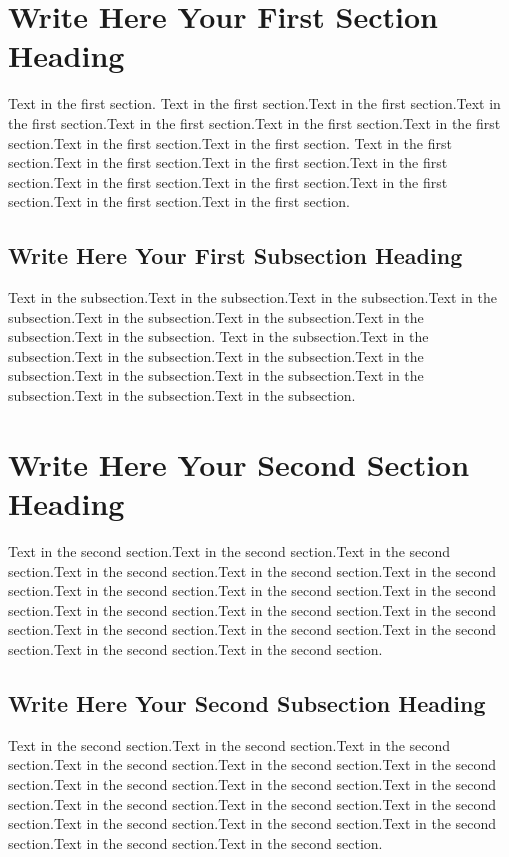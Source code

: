 \section{Write Here Your First Section Heading}
\hspace{4em}
Text in the first section. Text in the first section.Text in the first section.Text in the first section.Text in the first section.Text in the first section.Text in the first section.Text in the first section.Text in the first section.
Text in the first section.Text in the first section.Text in the first section.Text in the first section.Text in the first section.Text in the first section.Text in the first section.Text in the first section.Text in the first section.

\subsection{Write Here Your First Subsection Heading}
\hspace{4em}
Text in the subsection.Text in the subsection.Text in the subsection.Text in the subsection.Text in the subsection.Text in the subsection.Text in the subsection.Text in the subsection.
Text in the subsection.Text in the subsection.Text in the subsection.Text in the subsection.Text in the subsection.Text in the subsection.Text in the subsection.Text in the subsection.Text in the subsection.Text in the subsection.


\section{Write Here Your Second Section Heading}
\hspace{4em}
Text in the second section.Text in the second section.Text in the second section.Text in the second section.Text in the second section.Text in the second section.Text in the second section.Text in the second section.Text in the second section.Text in the second section.Text in the second section.Text in the second section.Text in the second section.Text in the second section.Text in the second section.Text in the second section.Text in the second section.

\subsection{Write Here Your Second Subsection Heading}
\hspace{4em}
Text in the second section.Text in the second section.Text in the second section.Text in the second section.Text in the second section.Text in the second section.Text in the second section.Text in the second section.Text in the second section.Text in the second section.Text in the second section.Text in the second section.Text in the second section.Text in the second section.Text in the second section.Text in the second section.Text in the second section.


